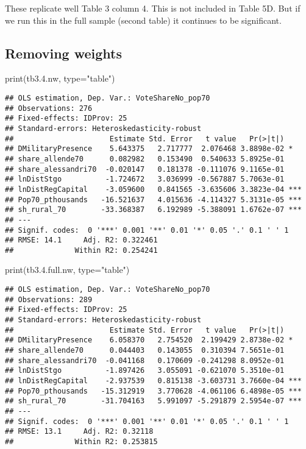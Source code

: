\documentclass[
]{article}
\newenvironment{Shaded}{\begin{snugshade}}{\end{snugshade}}
\newcommand{\AttributeTok}[1]{\textcolor[rgb]{0.77,0.63,0.00}{#1}}
\newcommand{\FloatTok}[1]{\textcolor[rgb]{0.00,0.00,0.81}{#1}}
\newcommand{\FunctionTok}[1]{\textcolor[rgb]{0.00,0.00,0.00}{#1}}
\newcommand{\NormalTok}[1]{#1}
\newcommand{\StringTok}[1]{\textcolor[rgb]{0.31,0.60,0.02}{#1}}
\begin{document}
These replicate well Table 3 column 4. This is not included in Table 5D.
But if we run this in the full sample (second table) it continues to be
significant.

\hypertarget{removing-weights}{%
\subsection{Removing weights}\label{removing-weights}}

\begin{Shaded}
\begin{Highlighting}[]
\FunctionTok{print}\NormalTok{(tb3.}\FloatTok{4.}\NormalTok{nw, }\AttributeTok{type=}\StringTok{"table"}\NormalTok{)}
\end{Highlighting}
\end{Shaded}

\begin{verbatim}
## OLS estimation, Dep. Var.: VoteShareNo_pop70
## Observations: 276 
## Fixed-effects: IDProv: 25
## Standard-errors: Heteroskedasticity-robust 
##                      Estimate Std. Error   t value   Pr(>|t|)    
## DMilitaryPresence    5.643375   2.717777  2.076468 3.8898e-02 *  
## share_allende70      0.082982   0.153490  0.540633 5.8925e-01    
## share_alessandri70  -0.020147   0.181378 -0.111076 9.1165e-01    
## lnDistStgo          -1.724672   3.036999 -0.567887 5.7063e-01    
## lnDistRegCapital    -3.059600   0.841565 -3.635606 3.3823e-04 ***
## Pop70_pthousands   -16.521637   4.015636 -4.114327 5.3131e-05 ***
## sh_rural_70        -33.368387   6.192989 -5.388091 1.6762e-07 ***
## ---
## Signif. codes:  0 '***' 0.001 '**' 0.01 '*' 0.05 '.' 0.1 ' ' 1
## RMSE: 14.1     Adj. R2: 0.322461
##              Within R2: 0.254241
\end{verbatim}

\begin{Shaded}
\begin{Highlighting}[]
\FunctionTok{print}\NormalTok{(tb3.}\FloatTok{4.}\NormalTok{full.nw, }\AttributeTok{type=}\StringTok{"table"}\NormalTok{)}
\end{Highlighting}
\end{Shaded}

\begin{verbatim}
## OLS estimation, Dep. Var.: VoteShareNo_pop70
## Observations: 289 
## Fixed-effects: IDProv: 25
## Standard-errors: Heteroskedasticity-robust 
##                      Estimate Std. Error   t value   Pr(>|t|)    
## DMilitaryPresence    6.058370   2.754520  2.199429 2.8738e-02 *  
## share_allende70      0.044403   0.143055  0.310394 7.5651e-01    
## share_alessandri70  -0.041168   0.170609 -0.241298 8.0952e-01    
## lnDistStgo          -1.897426   3.055091 -0.621070 5.3510e-01    
## lnDistRegCapital    -2.937539   0.815138 -3.603731 3.7660e-04 ***
## Pop70_pthousands   -15.312919   3.770628 -4.061106 6.4898e-05 ***
## sh_rural_70        -31.704163   5.991097 -5.291879 2.5954e-07 ***
## ---
## Signif. codes:  0 '***' 0.001 '**' 0.01 '*' 0.05 '.' 0.1 ' ' 1
## RMSE: 13.1     Adj. R2: 0.32118 
##              Within R2: 0.253815
\end{verbatim}
\end{document}
